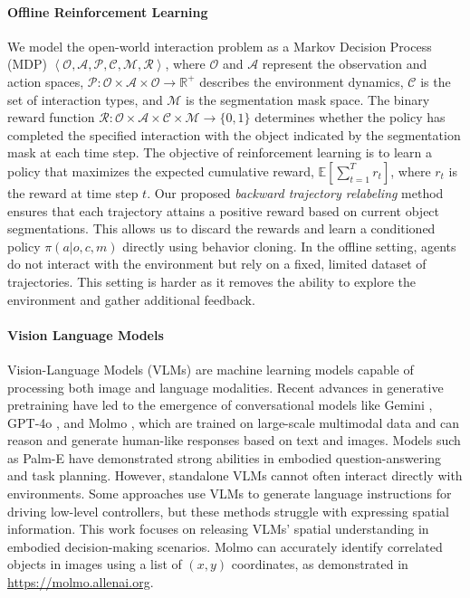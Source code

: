 \documentclass[11pt, a4paper, logo, two column]{craftjarvis}
\begin{document}
\paragraph{Offline Reinforcement Learning}
We model the open-world interaction problem as a Markov Decision Process (MDP) $\left< \mathcal{O}, \mathcal{A}, \mathcal{P}, \mathcal{C}, \mathcal{M}, \mathcal{R} \right>$, where $\mathcal{O}$ and $\mathcal{A}$ represent the observation and action spaces, $\mathcal{P}: \mathcal{O} \times \mathcal{A} \times \mathcal{O} \rightarrow \mathbb{R}^{+}$ describes the environment dynamics, $\mathcal{C}$ is the set of interaction types, and $\mathcal{M}$ is the segmentation mask space. The binary reward function $\mathcal{R}: \mathcal{O} \times \mathcal{A} \times \mathcal{C} \times \mathcal{M} \rightarrow \{0, 1\}$ determines whether the policy has completed the specified interaction with the object indicated by the segmentation mask at each time step. The objective of reinforcement learning is to learn a policy that maximizes the expected cumulative reward, $\mathbb{E} \left[ \sum_{t=1}^{T} r_t \right]$, where $r_t$ is the reward at time step $t$. 
Our proposed \emph{backward trajectory relabeling} method ensures that each trajectory attains a positive reward based on current object segmentations. This allows us to discard the rewards and learn a conditioned policy $\pi(a | o, c, m)$ directly using behavior cloning. In the offline setting, agents do not interact with the environment but rely on a fixed, limited dataset of trajectories. This setting is harder as it removes the ability to explore the environment and gather additional feedback. 

\paragraph{Vision Language Models} 
Vision-Language Models (VLMs) are machine learning models capable of processing both image and language modalities. Recent advances in generative pretraining have led to the emergence of conversational models like Gemini \citep{gemini}, GPT-4o \citep{gpt4}, and Molmo \citep{molmo}, which are trained on large-scale multimodal data and can reason and generate human-like responses based on text and images. Models such as Palm-E \citep{palm-e} have demonstrated strong abilities in embodied question-answering and task planning. However, standalone VLMs cannot often interact directly with environments. Some approaches use VLMs to generate language instructions for driving low-level controllers, but these methods struggle with expressing spatial information. This work focuses on releasing VLMs’ spatial understanding in embodied decision-making scenarios. 
Molmo can accurately identify correlated objects in images using a list of $(x, y)$ coordinates, as demonstrated in \url{https://molmo.allenai.org}. 
\end{document}

